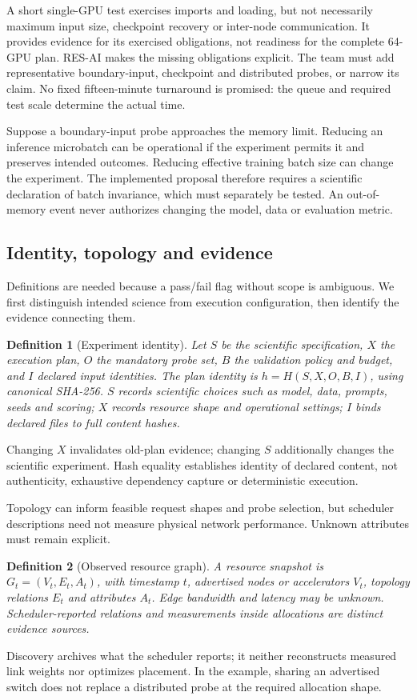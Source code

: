\documentclass[pdflatex,sn-mathphys-num]{sn-jnl}
\theoremstyle{thmstylethree}
\newtheorem{definition}{Definition}
\newcommand{\tool}{\textsc{RES-AI}}
\begin{document}
A short single-GPU test exercises imports and loading, but not necessarily maximum input size, checkpoint recovery or inter-node communication. It provides evidence for its exercised obligations, not readiness for the complete 64-GPU plan. \tool{} makes the missing obligations explicit. The team must add representative boundary-input, checkpoint and distributed probes, or narrow its claim. No fixed fifteen-minute turnaround is promised: the queue and required test scale determine the actual time.

Suppose a boundary-input probe approaches the memory limit. Reducing an inference microbatch can be operational if the experiment permits it and preserves intended outcomes. Reducing effective training batch size can change the experiment. The implemented proposal therefore requires a scientific declaration of batch invariance, which must separately be tested. An out-of-memory event never authorizes changing the model, data or evaluation metric.

\subsection{Identity, topology and evidence}
Definitions are needed because a pass/fail flag without scope is ambiguous. We first distinguish intended science from execution configuration, then identify the evidence connecting them.
\begin{definition}[Experiment identity]
Let $S$ be the scientific specification, $X$ the execution plan, $O$ the mandatory probe set, $B$ the validation policy and budget, and $I$ declared input identities. The plan identity is $h=H(S,X,O,B,I)$, using canonical SHA-256. $S$ records scientific choices such as model, data, prompts, seeds and scoring; $X$ records resource shape and operational settings; $I$ binds declared files to full content hashes.
\end{definition}
Changing $X$ invalidates old-plan evidence; changing $S$ additionally changes the scientific experiment. Hash equality establishes identity of declared content, not authenticity, exhaustive dependency capture or deterministic execution.

Topology can inform feasible request shapes and probe selection, but scheduler descriptions need not measure physical network performance. Unknown attributes must remain explicit.
\begin{definition}[Observed resource graph]
A resource snapshot is $G_t=(V_t,E_t,A_t)$, with timestamp $t$, advertised nodes or accelerators $V_t$, topology relations $E_t$ and attributes $A_t$. Edge bandwidth and latency may be unknown. Scheduler-reported relations and measurements inside allocations are distinct evidence sources.
\end{definition}
Discovery archives what the scheduler reports; it neither reconstructs measured link weights nor optimizes placement. In the example, sharing an advertised switch does not replace a distributed probe at the required allocation shape.
\end{document}
